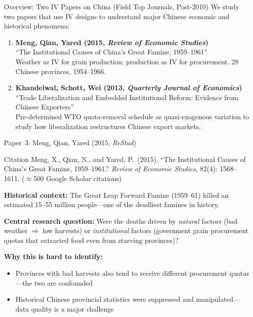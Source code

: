 \documentclass{beamer}
\begin{document}
\begin{frame}{Overview: Two IV Papers on China (Field Top Journals, Post-2010)}
We study two papers that use IV designs to understand major Chinese
economic and historical phenomena:
\begin{enumerate}
  \item \textbf{Meng, Qian, Yared (2015, \emph{Review of Economic Studies})}\\
        ``The Institutional Causes of China's Great Famine, 1959--1961''\\
        {\small Weather as IV for grain production; production as IV for
        procurement. 28 Chinese provinces, 1954--1966.}
  \medskip
  \item \textbf{Khandelwal, Schott, Wei (2013, \emph{Quarterly Journal of
        Economics})}\\
        ``Trade Liberalization and Embedded Institutional Reform:
        Evidence from Chinese Exporters''\\
        {\small Pre-determined WTO quota-removal schedule as quasi-exogenous
        variation to study how liberalization restructures Chinese export
        markets.}
\end{enumerate}
\end{frame}

\begin{frame}{Paper~3: Meng, Qian, Yared (2015, \emph{ReStud})}
\begin{block}{Citation}
  Meng, X., Qian, N., and Yared, P.\ (2015).
  ``The Institutional Causes of China's Great Famine, 1959--1961.''
  \textit{Review of Economic Studies}, 82(4): 1568--1611.
  {\small($\approx$500 Google Scholar citations)}
\end{block}

\textbf{Historical context:} The Great Leap Forward Famine (1959--61) killed an
estimated 15--55 million people---one of the deadliest famines in history.

\medskip
\textbf{Central research question:} Were the deaths driven by
\emph{natural} factors (bad weather $\Rightarrow$ low harvests) or
\emph{institutional} factors (government grain procurement quotas that
extracted food even from starving provinces)?

\medskip
\textbf{Why this is hard to identify:}
\begin{itemize}
  \item Provinces with bad harvests also tend to receive different
        procurement quotas---the two are confounded
  \item Historical Chinese provincial statistics were suppressed and
        manipulated---data quality is a major challenge
\end{itemize}
\end{frame}
\end{document}
